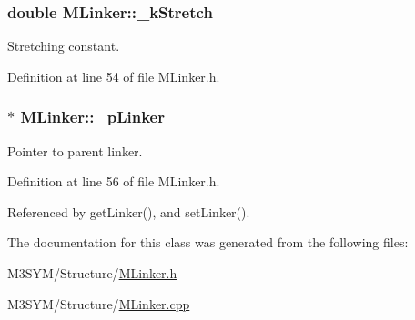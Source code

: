 \hypertarget{classMLinker_ac42b3d84c2cd277440c052f2f80ea68c}{
\subsubsection[{\+\_\+k\+Stretch}]{\setlength{\rightskip}{0pt plus 5cm}double M\+Linker\+::\+\_\+k\+Stretch\hspace{0.3cm}{\ttfamily [private]}}}\label{classMLinker_ac42b3d84c2cd277440c052f2f80ea68c}


Stretching constant. 



Definition at line 54 of file M\+Linker.\+h.

\hypertarget{classMLinker_abf4cccf6a06de78c9856c13c903c8edd}{
\subsubsection[{\+\_\+p\+Linker}]{$\ast$ M\+Linker\+::\+\_\+p\+Linker\hspace{0.3cm}{\ttfamily [private]}}}\label{classMLinker_abf4cccf6a06de78c9856c13c903c8edd}


Pointer to parent linker. 



Definition at line 56 of file M\+Linker.\+h.



Referenced by get\+Linker(), and set\+Linker().



The documentation for this class was generated from the following files\+:\begin{DoxyCompactItemize}
\item 
M3\+S\+Y\+M/\+Structure/\hyperlink{MLinker_8h}{M\+Linker.\+h}\item 
M3\+S\+Y\+M/\+Structure/\hyperlink{MLinker_8cpp}{M\+Linker.\+cpp}\end{DoxyCompactItemize}

